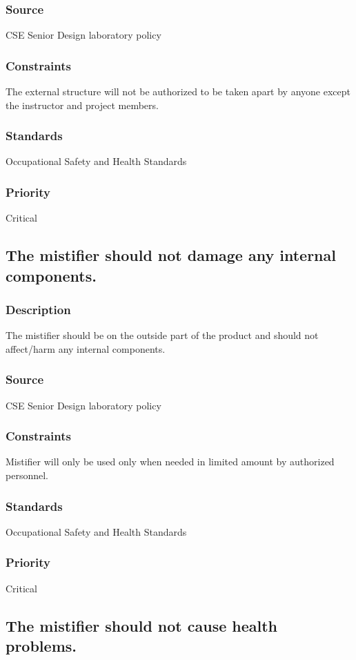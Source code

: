 \subsubsection{Source}
CSE Senior Design laboratory policy
\subsubsection{Constraints}
The external structure will not be authorized to be taken apart by anyone except the instructor and project members.
\subsubsection{Standards}
Occupational Safety and Health Standards
\subsubsection{Priority}
Critical

\subsection{The mistifier should not damage any internal components.}
\subsubsection{Description}
The mistifier should be on the outside part of the product and should not affect/harm any internal components.
\subsubsection{Source}
CSE Senior Design laboratory policy
\subsubsection{Constraints}
Mistifier will only be used only when needed in limited amount by authorized personnel.
\subsubsection{Standards}
Occupational Safety and Health Standards
\subsubsection{Priority}
Critical

\subsection{The mistifier should not cause health problems.}
